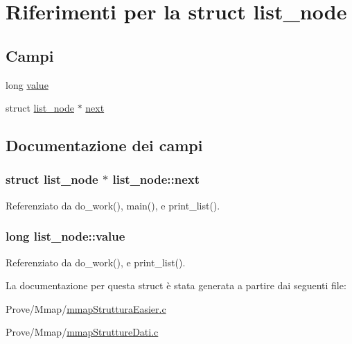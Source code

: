\hypertarget{structlist__node}{\section{Riferimenti per la struct list\+\_\+node}
\label{structlist__node}
}
\subsection*{Campi}
\begin{DoxyCompactItemize}
\item 
long \hyperlink{structlist__node_a783a68ff4a5e89d6739e38d708d13734}{value}
\item 
struct \hyperlink{structlist__node}{list\+\_\+node} $\ast$ \hyperlink{structlist__node_ad7161aa64a7b9659180387062bf096c2}{next}
\end{DoxyCompactItemize}


\subsection{Documentazione dei campi}
\hypertarget{structlist__node_ad7161aa64a7b9659180387062bf096c2}{
\subsubsection[{next}]{\setlength{\rightskip}{0pt plus 5cm}struct {\bf list\+\_\+node} $\ast$ list\+\_\+node\+::next}}\label{structlist__node_ad7161aa64a7b9659180387062bf096c2}


Referenziato da do\+\_\+work(), main(), e print\+\_\+list().

\hypertarget{structlist__node_a783a68ff4a5e89d6739e38d708d13734}{
\subsubsection[{value}]{\setlength{\rightskip}{0pt plus 5cm}long list\+\_\+node\+::value}}\label{structlist__node_a783a68ff4a5e89d6739e38d708d13734}


Referenziato da do\+\_\+work(), e print\+\_\+list().



La documentazione per questa struct è stata generata a partire dai seguenti file\+:\begin{DoxyCompactItemize}
\item 
Prove/\+Mmap/\hyperlink{mmapStrutturaEasier_8c}{mmap\+Struttura\+Easier.\+c}\item 
Prove/\+Mmap/\hyperlink{mmapStruttureDati_8c}{mmap\+Strutture\+Dati.\+c}\end{DoxyCompactItemize}
